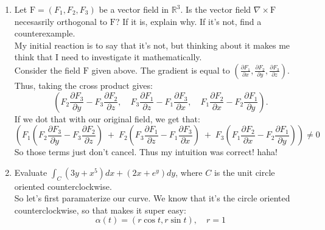 \documentclass[10pt,oneside]{book}
\newcommand{\R}{\mathbb{R}}
\newcommand{\prt}[2]{\frac{\partial #1}{\partial #2}}
\newcommand{\dsp}{\displaystyle}
\newcommand{\en}{\vspace{0.25cm}\\}
\newcommand{\centerit}[1]{{\begin{center} #1 \end{center}}}
\begin{document}
\begin{enumerate}
\begin{enumerate}
        \centerit{
            \begin{tabular}{cc}
                $\dsp\prt{F_1}y =2y$ & $\dsp\prt{F_2}{x}=2y$\\
            \end{tabular}
        }
        Well aint that dandy. If we subtract these two, we get zero curl for this field. Thus, our field is conservative, and finding a potential function should be a piece of cake. In order for our potential function to work, we these two conditions to be met:
        \centerit{
            \begin{tabular}{cc}
                $\prt{f(x,y)}x = F_1$ & $\prt{f(x,y)}y = F_2$
            \end{tabular}
        }
        So let's integrate both of our field components:
        \centerit{
            \begin{tabular}{cc}
                $\int F_1\,dx = \frac{1}3x^3 + xy^2$ & $\int F_2\,dy = xy^2$
            \end{tabular}
        }
        And considering that $\prt{\frac{1}3x^3}y = 0$, we have our potential function: $\boxed{f(x,y) = \frac{1}3x^3 + xy^2}$. 
    \end{enumerate}
    \newpage
    \item Let $\mathrm F = (F_1, F_2, F_3)$ be a vector field in $\R^3$. Is the vector field $\nabla \times \mathrm F$ necesasrily orthogonal to $\mathrm F$? If it is, explain why. If it's not, find a counterexample. \en
    My initial reaction is to say that it's not, but thinking about it makes me think that I need to investigate it mathematically. \en 
    Consider the field $\mathrm F$ given above. The gradient is equal to $(\prt{F_1}x,\prt{F_2}y, \prt{F_3}z)$. Thus, taking the cross product gives:
    \[\left(F_2\prt{F_3}y-F_3\prt{F_2}z,\quad F_3\prt{F_1}z - F_1\prt{F_3}x,\quad F_1\prt{F_2}x- F_2\prt{F_1}y\right).\]
    If we dot that with our original field, we get that:
    \[\boxed{\left(F_1\left(F_2\prt{F_3}y-F_3\prt{F_2}z\right)\;+\; F_2\left(F_3\prt{F_1}z - F_1\prt{F_3}x\right)\;+\; F_3\left(F_1\prt{F_2}x- F_2\prt{F_1}y\right)\right)\ne0}\]
    So those terms just don't cancel. Thus my intuition was correct! haha!
    \item Evaluate $\dsp \int_C(3y+x^5)dx+(2x+e^y)dy$, where $C$ is the unit circle oriented counterclockwise.\en
    So let's first paramaterize our curve. We know that it's the circle oriented counterclockwise, so that makes it super easy:
    \[\alpha(t) = (r\cos t, r\sin t),\quad r = 1\]

\end{enumerate}
\end{document}
